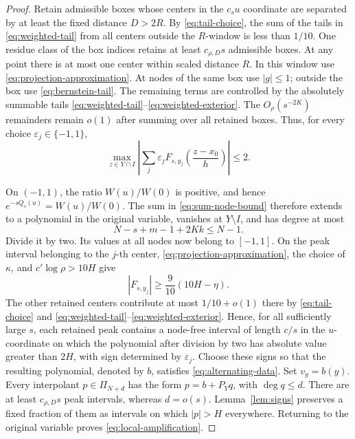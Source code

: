 \documentclass[11pt]{article}
\theoremstyle{definition}
\numberwithin{equation}{section}
\begin{document}
\begin{proof}
Retain admissible boxes whose centers in the \(c_su\) coordinate
are separated by at least the fixed distance \(D>2R\). By
\eqref{eq:tail-choice}, the sum of the tails in
\eqref{eq:weighted-tail} from all centers outside the \(R\)-window is
less than \(1/10\).
One residue class of the box indices retains at least
\(c_{\rho,D}s\) admissible boxes.
At any point there is at most one center within scaled distance \(R\).
In this window use \eqref{eq:projection-approximation}.
At nodes of the same box use \(|g|\le1\); outside the box use
\eqref{eq:bernstein-tail}. The remaining terms are controlled by
the absolutely summable tails
\eqref{eq:weighted-tail}--\eqref{eq:weighted-exterior}.
The \(O_\rho(s^{-2K})\) remainders remain \(o(1)\) after summing
over all retained boxes. Thus, for every choice
\(\varepsilon_j\in\{-1,1\}\),
\begin{equation}\label{eq:sum-node-bound}
 \max_{z\in Y\cap I}
 \left|\sum_j\varepsilon_j
 F_{s,y_j}\left(\frac{z-x_0}{h}\right)\right|\le2.
\end{equation}

On \((-1,1)\), the ratio \(W(u)/W(0)\) is positive, and hence
\(e^{-sQ_s(u)}=W(u)/W(0)\).
The sum in \eqref{eq:sum-node-bound} therefore extends to a
polynomial in the original variable, vanishes at \(Y\setminus I\),
and has degree at most
\begin{equation}\label{eq:degree-budget}
 N-s+m-1+2Kk\le N-1.
\end{equation}
Divide it by two. Its values at all nodes now belong to \([-1,1]\).
On the peak interval belonging to the \(j\)-th center,
\eqref{eq:projection-approximation}, the choice of \(\kappa\), and
\(c'\log\rho>10H\) give
\[
 |F_{s,y_j}|\ge\frac9{10}(10H-\eta).
\]
The other retained centers contribute at most \(1/10+o(1)\) there by
\eqref{eq:tail-choice} and
\eqref{eq:weighted-tail}--\eqref{eq:weighted-exterior}. Hence, for
all sufficiently large \(s\), each retained peak contains a node-free
interval of length \(c/s\) in the \(u\)-coordinate on which the
polynomial after division by two has absolute value greater than
\(2H\), with sign determined by \(\varepsilon_j\).
Choose these signs so that the resulting polynomial, denoted by
\(b\), satisfies \eqref{eq:alternating-data}.
Set \(v_y=b(y)\).
Every interpolant \(p\in\Pi_{N+d}\) has the form
\(p=b+P_Yq\), with \(\deg q\le d\).
There are at least \(c_{\rho,D}s\) peak intervals, whereas \(d=o(s)\).
Lemma~\ref{lem:signs} preserves a fixed fraction of them as
intervals on which \(|p|>H\) everywhere.
Returning to the original variable proves
\eqref{eq:local-amplification}.
\end{proof}
\end{document}
